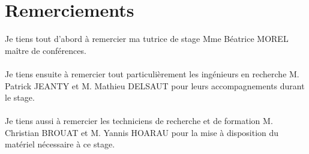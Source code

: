 \documentclass[12pt,a4paper]{article}
\begin{document}
\section*{Remerciements}
\sf
Je tiens tout d'abord à remercier ma tutrice de stage Mme Béatrice MOREL maître de conférences.\\
~\\
Je tiens ensuite à remercier tout particulièrement les ingénieurs en recherche M. Patrick JEANTY et M. Mathieu DELSAUT pour leurs accompagnements durant le stage.\\
~\\
Je tiens aussi à remercier les techniciens de recherche et de formation M. Christian BROUAT et M. Yannis HOARAU pour la mise à disposition du matériel nécessaire à ce stage.
 
 
~


\newpage







\thispagestyle{empty}
\renewcommand{\contentsname}{Sommaire}
\tableofcontents
\newpage

\newpage
\end{document}
